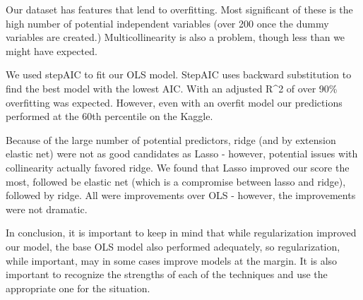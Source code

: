\documentclass[
]{article}
\begin{document}
Our dataset has features that lend to overfitting. Most significant of
these is the high number of potential independent variables (over 200
once the dummy variables are created.) Multicollinearity is also a
problem, though less than we might have expected.

We used stepAIC to fit our OLS model. StepAIC uses backward substitution
to find the best model with the lowest AIC. With an adjusted R\^{}2 of
over 90\% overfitting was expected. However, even with an overfit model
our predictions performed at the 60th percentile on the Kaggle.

Because of the large number of potential predictors, ridge (and by
extension elastic net) were not as good candidates as Lasso - however,
potential issues with collinearity actually favored ridge. We found that
Lasso improved our score the most, followed be elastic net (which is a
compromise between lasso and ridge), followed by ridge. All were
improvements over OLS - however, the improvements were not dramatic.

In conclusion, it is important to keep in mind that while regularization
improved our model, the base OLS model also performed adequately, so
regularization, while important, may in some cases improve models at the
margin. It is also important to recognize the strengths of each of the
techniques and use the appropriate one for the situation.
\end{document}
